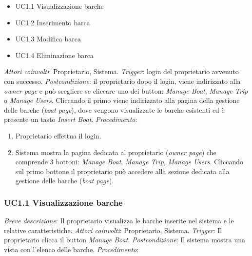 \begin{itemize}
    \item UC1.1 Visualizzazione barche
    \item UC1.2 Inserimento barca
    \item UC1.3 Modifica barca
    \item UC1.4 Eliminazione barca
\end{itemize}

 \emph{Attori coinvolti}: Proprietario, Sistema.\medbreak
 \emph{Trigger}: login del proprietario avvenuto con successo.\medbreak
 \emph{Postcondizione}: il proprietario dopo il login, viene indirizzato alla \textit{owner page} e può scegliere se cliccare uno dei button: \textit{Manage Boat}, \textit{Manage Trip} o \textit{Manage Users}. Cliccando il primo viene indirizzato alla pagina della gestione delle barche (\textit{boat page}), dove vengono visualizzate le barche esistenti ed è presente un tasto \textit{Insert Boat}. \medbreak
 \emph{Procedimento}:

\begin{enumerate}
    \item Proprietario effettua il login.
    \item Sistema mostra la pagina dedicata al proprietario (\textit{owner page}) che comprende 3 bottoni:  \textit{Manage Boat}, \textit{Manage Trip}, \textit{Manage Users}. Cliccando sul primo bottone il proprietario può accedere alla sezione dedicata alla gestione delle barche (\textit{boat page}).
\end{enumerate}

\subsubsection{UC1.1 Visualizzazione barche}

 \emph{Breve descrizione}: Il proprietario visualizza le barche inserite nel sistema e le relative caratteristiche.\medbreak
 \emph{Attori coinvolti}: Proprietario, Sistema.\medbreak
 \emph{Trigger}: Il proprietario clicca il button \textit{Manage Boat}.\medbreak
 \emph{Postcondizione}: Il sistema mostra una vista con l'elenco delle barche.\medbreak
 \emph{Procedimento}:

